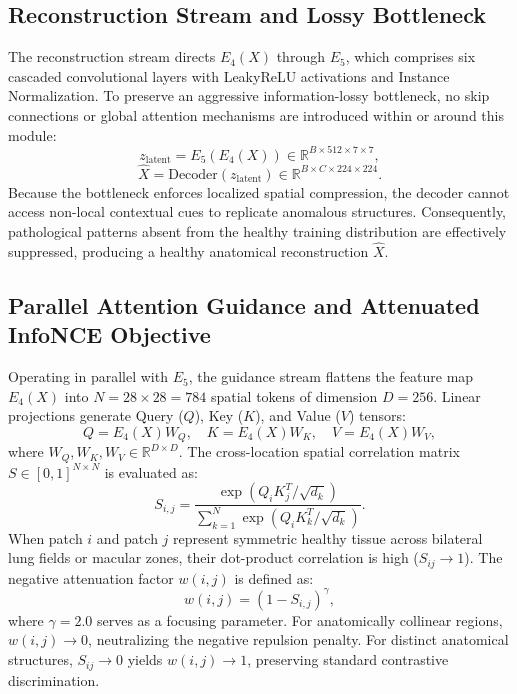 \documentclass[journal]{IEEEtran}
\begin{document}
\subsection{Reconstruction Stream and Lossy Bottleneck}
The reconstruction stream directs $E_4(X)$ through $E_5$, which comprises six cascaded convolutional layers with LeakyReLU activations and Instance Normalization. To preserve an aggressive information-lossy bottleneck, no skip connections or global attention mechanisms are introduced within or around this module:
\begin{equation}
z_{\text{latent}} = E_5\left(E_4(X)\right) \in \mathbb{R}^{B \times 512 \times 7 \times 7},
\end{equation}
\begin{equation}
\hat{X} = \text{Decoder}\left(z_{\text{latent}}\right) \in \mathbb{R}^{B \times C \times 224 \times 224}.
\end{equation}
Because the bottleneck enforces localized spatial compression, the decoder cannot access non-local contextual cues to replicate anomalous structures. Consequently, pathological patterns absent from the healthy training distribution are effectively suppressed, producing a healthy anatomical reconstruction $\hat{X}$.

\subsection{Parallel Attention Guidance and Attenuated InfoNCE Objective}
Operating in parallel with $E_5$, the guidance stream flattens the feature map $E_4(X)$ into $N = 28 \times 28 = 784$ spatial tokens of dimension $D = 256$. Linear projections generate Query ($Q$), Key ($K$), and Value ($V$) tensors:
\begin{equation}
Q = E_4(X) W_Q, \quad K = E_4(X) W_K, \quad V = E_4(X) W_V,
\end{equation}
where $W_Q, W_K, W_V \in \mathbb{R}^{D \times D}$. The cross-location spatial correlation matrix $S \in [0, 1]^{N \times N}$ is evaluated as:
\begin{equation}
S_{i,j} = \frac{\exp\left(Q_i K_j^T / \sqrt{d_k}\right)}{\sum_{k=1}^N \exp\left(Q_i K_k^T / \sqrt{d_k}\right)}.
\end{equation}
When patch $i$ and patch $j$ represent symmetric healthy tissue across bilateral lung fields or macular zones, their dot-product correlation is high ($S_{ij} \to 1$). The negative attenuation factor $w(i,j)$ is defined as:
\begin{equation}
w(i,j) = \left(1 - S_{i,j}\right)^\gamma,
\end{equation}
where $\gamma = 2.0$ serves as a focusing parameter. For anatomically collinear regions, $w(i,j) \to 0$, neutralizing the negative repulsion penalty. For distinct anatomical structures, $S_{ij} \to 0$ yields $w(i,j) \to 1$, preserving standard contrastive discrimination.
\end{document}
